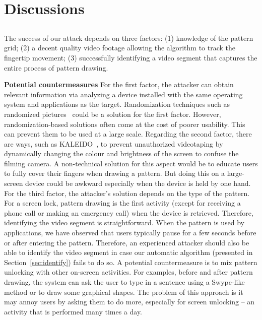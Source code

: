 \section{Discussions}

\subsection{}

The success of our attack depends on three factors: (1)
knowledge of the pattern grid; (2) a decent
quality video footage allowing the algorithm to track the fingertip movement;
(3) successfully identifying a video segment that captures the entire process of pattern drawing.


\noindent \textbf{Potential countermeasures} For the first factor, the attacker can obtain relevant information via analyzing a device installed with the same operating system and applications as the target.
Randomization techniques such as
randomized pictures~\cite{biddle2012graphical,hossein2015fortifying} could be a solution for the first factor.
However, randomization-based solutions often come at the cost of poorer
usability. This can prevent them to be used at a large scale.
Regarding the second factor, there are ways, such as
KALEIDO~\cite{zhang2015kaleido}, to prevent unauthorized videotaping by
dynamically changing the colour and brightness of the screen to confuse the
filming camera. A non-technical solution for this aspect would be to educate users to
fully cover their fingers when drawing a pattern. But doing this on a large-screen device could be awkward especially when the device is held by one hand.
For the third factor, the attacker's solution depends on the type of the pattern. For a screen lock, pattern drawing is the first activity (except
for receiving a phone call or making an emergency call) when the device is
retrieved. Therefore, identifying the video segment is straightforward. When
the pattern is used by applications, we have observed that users typically
pause for a few seconds before or after entering the pattern. Therefore, an experienced attacker should also be able
to identify the video segment in case our automatic algorithm (presented in
Section~\ref{sec:identify}) fails to do so. A potential countermeasure is to mix
pattern unlocking with other on-screen activities. For examples, before and
after pattern drawing, the system can ask the user to type in a sentence
using a Swype-like method or
to draw some graphical shapes. The problem of this approach is it may annoy users by asking
them to do more, especially for screen unlocking -- an activity that is performed
many times a day.

